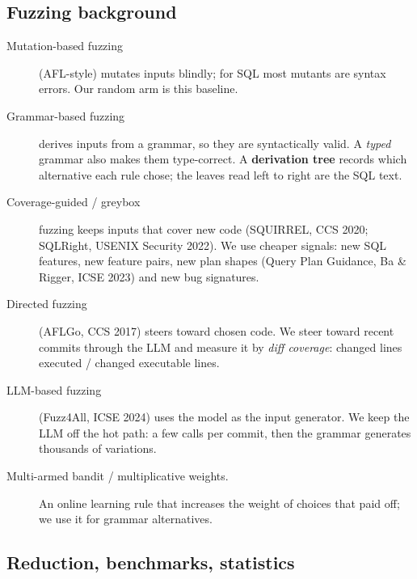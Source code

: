 \subsection{Fuzzing background}

\begin{description}
  \item[Mutation-based fuzzing] (AFL-style) mutates inputs blindly; for SQL
    most mutants are syntax errors. Our random arm is this baseline.
  \item[Grammar-based fuzzing] derives inputs from a grammar, so they are
    syntactically valid. A \emph{typed} grammar also makes them type-correct.
    A \textbf{derivation tree} records which alternative each rule chose; the
    leaves read left to right are the SQL text.
  \item[Coverage-guided / greybox] fuzzing keeps inputs that cover new code
    (SQUIRREL, CCS 2020; SQLRight, USENIX Security 2022). We use cheaper
    signals: new SQL features, new feature pairs, new plan shapes (Query Plan
    Guidance, Ba \& Rigger, ICSE 2023) and new bug signatures.
  \item[Directed fuzzing] (AFLGo, CCS 2017) steers toward chosen code. We
    steer toward recent commits through the LLM and measure it by
    \emph{diff coverage}: changed lines executed / changed executable lines.
  \item[LLM-based fuzzing] (Fuzz4All, ICSE 2024) uses the model as the input
    generator. We keep the LLM off the hot path: a few calls per commit,
    then the grammar generates thousands of variations.
  \item[Multi-armed bandit / multiplicative weights.] An online learning rule
    that increases the weight of choices that paid off; we use it for grammar
    alternatives.
\end{description}

\subsection{Reduction, benchmarks, statistics}

